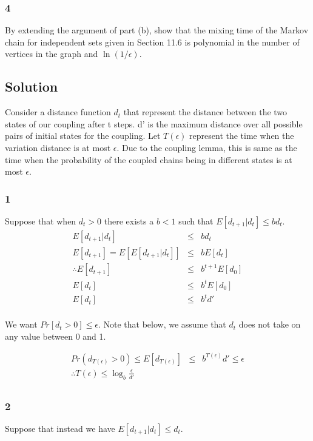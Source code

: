 \documentclass[10pt]{amsart}
\theoremstyle{remark}
\begin{document}
\subsubsection{4} By extending the argument of part (b), show that the mixing time of the Markov chain for independent sets given in Section 11.6 is polynomial in the number of vertices in the graph and $\ln(1/\epsilon)$.

\subsection{Solution}

Consider a distance function $d_{t}$ that represent the distance between the two states of our coupling after t steps. d' is the maximum distance over all possible pairs of initial states for the coupling. Let $T(\epsilon)$ represent the time when the variation distance is at most $\epsilon$. Due to the coupling lemma, this is same as the time when the probability of the coupled chains being in different states is at most $\epsilon$.

\subsubsection{1}

Suppose that when $d_{t}>0$ there exists a $b<1$ such that $E[d_{t+1}|d_{t}]\leq bd_{t}$.
\begin{eqnarray}
E[d_{t+1}|d_{t}] &\leq& bd_{t}\\
E[d_{t+1}] = E[E[d_{t+1}|d_{t}]] &\leq& bE[d_{t}]\\
\therefore E[d_{t+1}] &\leq& b^{t+1}E[d_{0}]\\
E[d_{t}] &\leq& b^{t}E[d_{0}]\\
E[d_{t}] &\leq& b^{t}d'\\
\end{eqnarray} 

We want $Pr[d_{t} > 0] \leq \epsilon$. Note that below, we assume that $d_{t}$ does not take on any value between 0 and 1.

\begin{eqnarray}
Pr(d_{T(\epsilon)} > 0) \leq E[d_{T(\epsilon)}] &\leq& b^{T(\epsilon)}d' \leq \epsilon\\
\therefore T(\epsilon) \leq \log_{b} \frac{\epsilon}{d'}\\
\end{eqnarray}

\subsubsection{2} Suppose that instead we have
$E[d_{t+1}|d_{t}]\leq d_{t}$.
\end{document}
